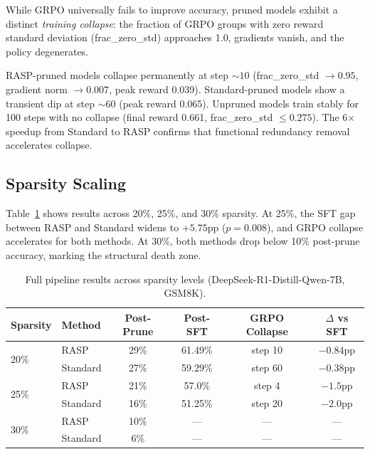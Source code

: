 \documentclass[11pt]{article}
\begin{document}
While GRPO universally fails to improve accuracy, pruned models exhibit a distinct \emph{training collapse}: the fraction of GRPO groups with zero reward standard deviation (frac\_zero\_std) approaches 1.0, gradients vanish, and the policy degenerates.

RASP-pruned models collapse permanently at step ${\sim}10$ (frac\_zero\_std $\to 0.95$, gradient norm $\to 0.007$, peak reward 0.039).
Standard-pruned models show a transient dip at step ${\sim}60$ (peak reward 0.065).
Unpruned models train stably for 100 steps with no collapse (final reward 0.661, frac\_zero\_std $\leq 0.275$).
The 6$\times$ speedup from Standard to RASP confirms that functional redundancy removal accelerates collapse.

\subsection{Sparsity Scaling}
\label{sec:sparsity}

Table~\ref{tab:sparsity_scaling} shows results across 20\%, 25\%, and 30\% sparsity.
At 25\%, the SFT gap between RASP and Standard widens to $+5.75$pp ($p{=}0.008$), and GRPO collapse accelerates for both methods.
At 30\%, both methods drop below 10\% post-prune accuracy, marking the structural death zone.

\begin{table}[t]
\centering
\caption{Full pipeline results across sparsity levels (DeepSeek-R1-Distill-Qwen-7B, GSM8K).}
\label{tab:sparsity_scaling}
\begin{tabular}{llcccc}
\toprule
\textbf{Sparsity} & \textbf{Method} & \textbf{Post-Prune} & \textbf{Post-SFT} & \textbf{GRPO Collapse} & \textbf{$\Delta$ vs SFT} \\
\midrule
\multirow{2}{*}{20\%} & RASP     & 29\% & 61.49\% & step 10  & $-0.84$pp \\
                       & Standard & 27\% & 59.29\% & step 60  & $-0.38$pp \\
\midrule
\multirow{2}{*}{25\%} & RASP     & 21\% & 57.0\%  & step 4   & $-1.5$pp \\
                       & Standard & 16\% & 51.25\% & step 20  & $-2.0$pp \\
\midrule
\multirow{2}{*}{30\%} & RASP     & 10\% & ---     & ---      & --- \\
                       & Standard & 6\%  & ---     & ---      & --- \\
\bottomrule
\end{tabular}
\end{table}
\end{document}

